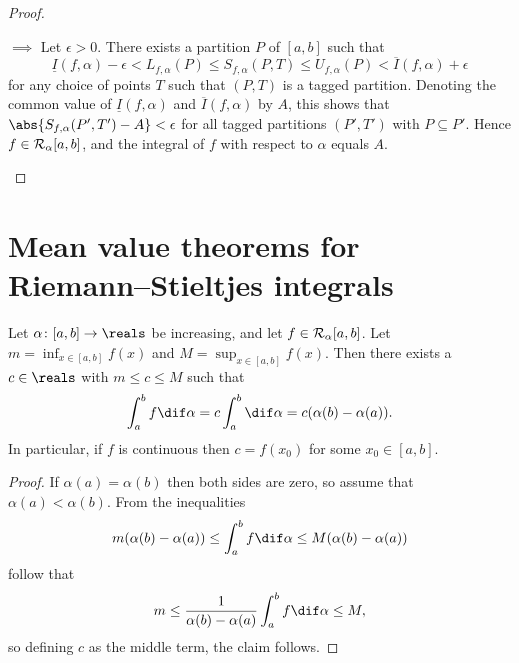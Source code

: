 \documentclass[article, a4paper, 11pt, oneside]{memoir}
\numberwithin{equation}{chapter}
\begin{document}
\begin{proof}
\begin{proofsec}
    \item[\subcref{enum:upper-lower-integrals-equal} $\implies$ \subcref{enum:integrability}]
    Let $\epsilon > 0$. There exists a partition $P$ of $[a,b]$ such that
    \begin{equation*}
        \underline{I}(f,\alpha) - \epsilon
        < L_{f,\alpha}(P)
        \leq S_{f,\alpha}(P,T)
        \leq U_{f,\alpha}(P)
        < \overline{I}(f,\alpha) + \epsilon
    \end{equation*}
    for any choice of points $T$ such that $(P,T)$ is a tagged partition. Denoting the common value of $\underline{I}(f,\alpha)$ and $\overline{I}(f,\alpha)$ by $A$, this shows that $\abs{S_{f,\alpha}(P',T') - A} < \epsilon$ for all tagged partitions $(P',T')$ with $P \subseteq P'$. Hence $f \in \integrable[\alpha]{a,b}$, and the integral of $f$ with respect to $\alpha$ equals $A$.
\end{proofsec}
\end{proof}


\section{Mean value theorems for Riemann--Stieltjes integrals}

\begin{proposition}
    \label{prop:integral-MVT1}
    Let $\alpha \colon [a,b] \to \reals$ be increasing, and let $f \in \integrable[\alpha]{a,b}$. Let $m = \inf_{x \in [a,b]} f(x)$ and $M = \sup_{x \in [a,b]} f(x)$. Then there exists a $c \in \reals$ with $m \leq c \leq M$ such that
    \begin{equation*}
        \int_a^b f \dif\alpha
            = c \int_a^b \dif\alpha
            = c (\alpha(b) - \alpha(a)).
    \end{equation*}
    In particular, if $f$ is continuous then $c = f(x_0)$ for some $x_0 \in [a,b]$.
\end{proposition}

\begin{proof}
    If $\alpha(a) = \alpha(b)$ then both sides are zero, so assume that $\alpha(a) < \alpha(b)$. From the inequalities
    \begin{equation*}
        m (\alpha(b) - \alpha(a))
            \leq \int_a^b f \dif\alpha
            \leq M (\alpha(b) - \alpha(a))
    \end{equation*}
    follow that
    \begin{equation*}
        m 
            \leq \frac{1}{\alpha(b) - \alpha(a)} \int_a^b f \dif\alpha
            \leq M,
    \end{equation*}
    so defining $c$ as the middle term, the claim follows.
\end{proof}
\end{document}

